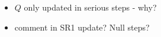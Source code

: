 






 



\begin{itemize}
	\item \(Q\) only updated in serious steps - why?
	\item comment in SR1 update? Null steps?
\end{itemize}

